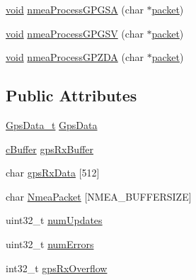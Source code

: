 \begin{DoxyCompactItemize}
\item 
\hyperlink{group___u_a_v_objects_plugin_ga444cf2ff3f0ecbe028adce838d373f5c}{void} \hyperlink{group___g_p_s_gadget_plugin_gad10ce6b495849dd4cf6e019d650a87f7}{nmea\-Process\-G\-P\-G\-S\-A} (char $\ast$\hyperlink{group___antenna_track_gadget_plugin_gaa52c8cc41458c01d411d550d1e3f3d96}{packet})
\item 
\hyperlink{group___u_a_v_objects_plugin_ga444cf2ff3f0ecbe028adce838d373f5c}{void} \hyperlink{group___g_p_s_gadget_plugin_ga35b60b2a2f0643fd5202557a5aaace81}{nmea\-Process\-G\-P\-G\-S\-V} (char $\ast$\hyperlink{group___antenna_track_gadget_plugin_gaa52c8cc41458c01d411d550d1e3f3d96}{packet})
\item 
\hyperlink{group___u_a_v_objects_plugin_ga444cf2ff3f0ecbe028adce838d373f5c}{void} \hyperlink{group___g_p_s_gadget_plugin_ga01e0952dc227b7f7d3cef2d36f684544}{nmea\-Process\-G\-P\-Z\-D\-A} (char $\ast$\hyperlink{group___antenna_track_gadget_plugin_gaa52c8cc41458c01d411d550d1e3f3d96}{packet})
\end{DoxyCompactItemize}
\subsection*{\-Public \-Attributes}
\begin{DoxyCompactItemize}
\item 
\hyperlink{group___g_p_s_gadget_plugin_ga4f1b5520a42a0033fb4d09fc7cbc2197}{\-Gps\-Data\-\_\-t} \hyperlink{group___g_p_s_gadget_plugin_ga5ed5a691ba188edd73dbfa5e6a72ee31}{\-Gps\-Data}
\item 
\hyperlink{group__buffer_ga63b2a19263ed371e329776b34f3164eb}{c\-Buffer} \hyperlink{group___g_p_s_gadget_plugin_gae55785b07246236cfe8d6c3139becff1}{gps\-Rx\-Buffer}
\item 
char \hyperlink{group___g_p_s_gadget_plugin_gaef781170a93672b3bbc887fcabdcb369}{gps\-Rx\-Data} \mbox{[}512\mbox{]}
\item 
char \hyperlink{group___g_p_s_gadget_plugin_ga3d1bdb9e4264f153e4537750bb8d7fd9}{\-Nmea\-Packet} \mbox{[}\-N\-M\-E\-A\-\_\-\-B\-U\-F\-F\-E\-R\-S\-I\-Z\-E\mbox{]}
\item 
uint32\-\_\-t \hyperlink{group___g_p_s_gadget_plugin_ga08ee9a94774bf6691a26d600e1ea51a9}{num\-Updates}
\item 
uint32\-\_\-t \hyperlink{group___g_p_s_gadget_plugin_gaef5bd2863b92f02db2ad4ef9e66e9437}{num\-Errors}
\item 
int32\-\_\-t \hyperlink{group___g_p_s_gadget_plugin_gaf0b70b48a4a5943f40dc14c11b8e0712}{gps\-Rx\-Overflow}
\end{DoxyCompactItemize}


